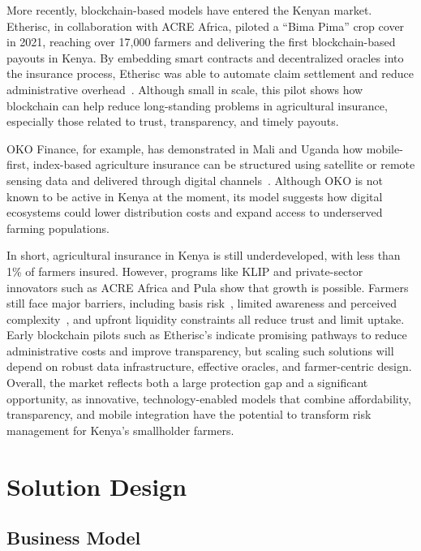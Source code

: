 \documentclass[11pt,a4paper]{article}
\begin{document}
    More recently, blockchain-based models have entered the Kenyan market.
    Etherisc, in collaboration with ACRE Africa, piloted a \enquote{Bima Pima} crop cover in 2021, reaching over 17,000 farmers and delivering the first blockchain-based payouts in Kenya.
    By embedding smart contracts and decentralized oracles into the insurance process, Etherisc was able to automate claim settlement and reduce administrative overhead~\parencite{Etherisc2021}.
    Although small in scale, this pilot shows how blockchain can help reduce long-standing problems in agricultural insurance, especially those related to trust, transparency, and timely payouts.

    OKO Finance, for example, has demonstrated in Mali and Uganda how mobile-first, index-based agriculture insurance can be structured using satellite or remote sensing data and delivered through digital channels~\parencite{ADA_OKOFinance2021}.
    Although OKO is not known to be active in Kenya at the moment, its model suggests how digital ecosystems could lower distribution costs and expand access to underserved farming populations.

    In short, agricultural insurance in Kenya is still underdeveloped, with less than 1\% of farmers insured.
    However, programs like KLIP and private-sector innovators such as ACRE Africa and Pula show that growth is possible.
    Farmers still face major barriers, including basis risk~\parencite{Jensen2016}, limited awareness and perceived complexity~\parencite{Janzen2020}, and upfront liquidity constraints all reduce trust and limit uptake.
    Early blockchain pilots such as Etherisc's indicate promising pathways to reduce administrative costs and improve transparency, but scaling such solutions will depend on robust data infrastructure, effective oracles, and farmer-centric design.
    Overall, the market reflects both a large protection gap and a significant opportunity, as innovative, technology-enabled models that combine affordability, transparency, and mobile integration have the potential to transform risk management for Kenya's smallholder farmers.

	\section{Solution Design}\label{sec:solution design}

	\subsection{Business Model}
\end{document}
